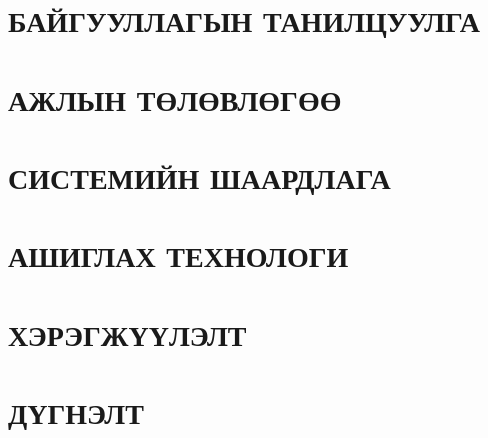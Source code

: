 
\chapter{БАЙГУУЛЛАГЫН ТАНИЛЦУУЛГА}


\chapter{АЖЛЫН ТӨЛӨВЛӨГӨӨ}


\chapter{СИСТЕМИЙН ШААРДЛАГА}


\chapter{АШИГЛАХ ТЕХНОЛОГИ}


\chapter{ХЭРЭГЖҮҮЛЭЛТ}


\chapter{ДҮГНЭЛТ}
